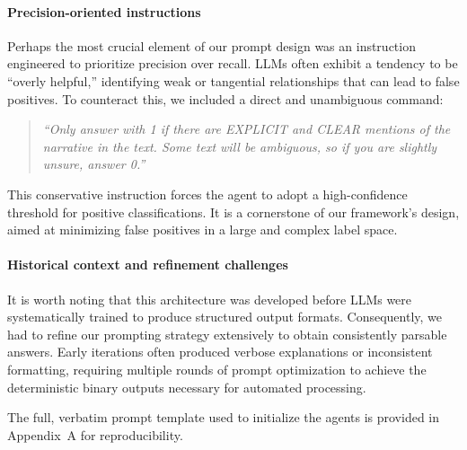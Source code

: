 \paragraph{Precision-oriented instructions}
Perhaps the most crucial element of our prompt design was an instruction engineered to prioritize precision over recall. LLMs often exhibit a tendency to be ``overly helpful,'' identifying weak or tangential relationships that can lead to false positives. To counteract this, we included a direct and unambiguous command:

\begin{quote}
\itshape ``Only answer with 1 if there are EXPLICIT and CLEAR mentions of the narrative in the text. Some text will be ambiguous, so if you are slightly unsure, answer 0.''
\end{quote}

This conservative instruction forces the agent to adopt a high-confidence threshold for positive classifications. It is a cornerstone of our framework's design, aimed at minimizing false positives in a large and complex label space.

\paragraph{Historical context and refinement challenges}
It is worth noting that this architecture was developed before LLMs were systematically trained to produce structured output formats. Consequently, we had to refine our prompting strategy extensively to obtain consistently parsable answers. Early iterations often produced verbose explanations or inconsistent formatting, requiring multiple rounds of prompt optimization to achieve the deterministic binary outputs necessary for automated processing.

The full, verbatim prompt template used to initialize the agents is provided in Appendix~A for reproducibility.


